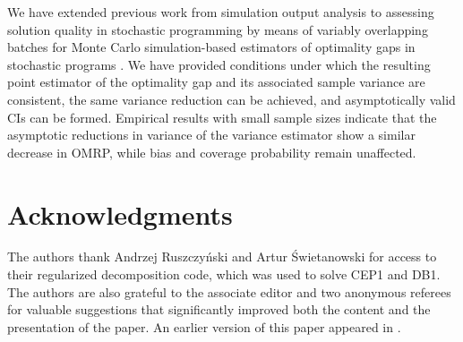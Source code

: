 \documentclass[12pt]{article}
\begin{document}
We have extended previous work from simulation output analysis to assessing solution quality in stochastic programming by means of variably overlapping batches \citep{Meketon1984,Song1992,Welch1987} for Monte Carlo simulation-based estimators of optimality gaps in stochastic programs \citep{Mak1999}. 
We have provided conditions under which the resulting point estimator of the optimality gap and its associated sample variance are consistent, the same variance reduction can be achieved, and asymptotically valid CIs can be formed. 
Empirical results with small sample sizes indicate that the asymptotic reductions in variance of the variance estimator show a similar decrease in OMRP, while bias and coverage probability remain unaffected. 

\section*{Acknowledgments}
The authors thank Andrzej Ruszczy{\'{n}}ski and Artur {\'{S}}wietanowski for
access to their regularized decomposition code, which was used to solve CEP1 and DB1. 
The authors are also grateful to the associate editor and two anonymous referees for valuable suggestions that significantly improved both the content and the presentation of the paper. 
An earlier version of this paper appeared in \citep{love2011overlapping}.



\end{document}
